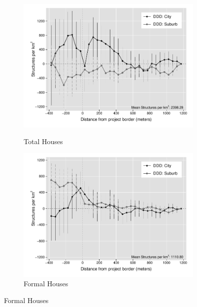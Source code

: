 \documentclass[12pt]{article}
\begin{document}
\begin{figure}[t!]
    \centering
    \vspace{2mm}
    \begin{subfigure}[b]{0.49\textwidth}
        \centering
        \caption[]{\small Total Houses}  
        \vspace{-1mm}
        \includegraphics[width=\textwidth,trim={.5cm .3cm .3cm 0cm}, clip=true]{figures/distplotDDD_bblu_total_buildings_admin_het}
        \label{fig:DDDtotal_het}
    \end{subfigure}
    \hfill
    \begin{subfigure}[b]{0.49\textwidth}  
        \centering 
        \caption[]{\small Formal Houses}
        \vspace{-1mm}
        \includegraphics[width=\textwidth,trim={.5cm .3cm .3cm 0cm}, clip=true]{figures/distplotDDD_bblu_for_admin_het}     

\end{subfigure}
\end{figure}
\end{document}
